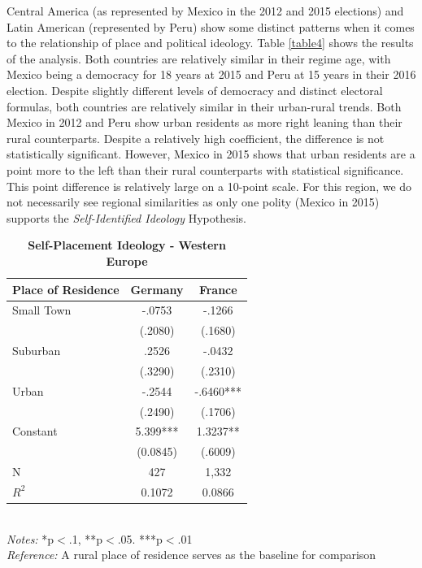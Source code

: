 \documentclass[12pt, titlepage]{article}
\newcommand\e{\emph}
\newcommand\tb{\textbf}
\begin{document}
Central America (as represented by Mexico in the 2012 and 2015 elections) and Latin American (represented by Peru) show some distinct patterns when it comes to the relationship of place and political ideology. Table \ref{table4} shows the results of the analysis. Both countries are relatively similar in their regime age, with Mexico being a democracy for 18 years at 2015 and Peru at 15 years in their 2016 election. Despite slightly different levels of democracy and distinct electoral formulas, both countries are relatively similar in their urban-rural trends. Both Mexico in 2012 and Peru show urban residents as more right leaning than their rural counterparts. Despite a relatively high coefficient, the difference is not statistically significant. However, Mexico in 2015 shows that urban residents are a point more to the left than their rural counterparts with statistical significance. This point difference is relatively large on a 10-point scale. For this region, we do not necessarily see regional similarities as only one polity (Mexico in 2015) supports the \e{Self-Identified Ideology} Hypothesis.

\begin{singlespace}
\begin{table}[H]
		\centering
		\caption{\tb{Self-Placement Ideology - Western Europe}}
		\begin{tabulary}{\linewidth}{l c c }
			\\
			\hline
			\tb{Place of Residence}&\tb{Germany}&\tb{France} \\
			\hline
			Small Town   & -.0753 &-.1266  \\      
			& (.2080)  & (.1680)   \\
			Suburban   & .2526 & -.0432    \\ 
			 & (.3290)  & (.2310)    \\
			Urban   & -.2544 & -.6460***    \\
			 &(.2490)  & (.1706)   \\
			Constant  & 5.399***  & 1.3237** \\
			&(0.0845)&(.6009) \\
			N  &427  & 1,332    \\
			$R^2$  &0.1072 &0.0866  \\
			\hline                                       
		\end{tabulary} 
		\\
		\e{Notes:} *p$<$.1, **p$<$.05. ***p$<$.01 \\
		\e{Reference:} A rural place of residence serves as the baseline for comparison
		\label{table5}
\end{table}
\end{singlespace}
\end{document}
